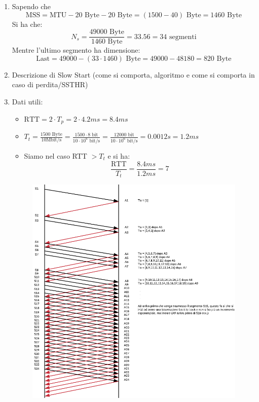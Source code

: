 \documentclass[10pt,a4paper]{article}
\begin{document}
	\begin{enumerate}
		\item Sapendo che $$\textrm{MSS} = \textrm{MTU} - 20 \textrm{ Byte} - 20 \textrm{ Byte} = (1500 - 40) \textrm{ Byte} = 1460 \textrm{ Byte}$$
			Si ha che: $$N_s = \frac{49000 \textrm{ Byte}}{1460 \textrm{ Byte}} = 33.56 = 34 \textrm{ segmenti}$$
			Mentre l'ultimo segmento ha dimensione: $$\textrm{Last} = 49000 - (33 \cdot 1460) \textrm{ Byte} = 49000 - 48180 = 820 \textrm{ Byte}$$
		\item Descrizione di Slow Start (come si comporta, algoritmo e come si comporta in caso di perdita/SSTHR)
		\item Dati utili:
			\begin{itemize}
				\item $\textrm{RTT} = 2 \cdot T_p = 2 \cdot 4.2 ms = 8.4 ms$
				\item $T_t = \displaystyle{\frac{1500 \textrm{ Byte}}{10 \textrm{Mbit/s}} = \frac{1500 \cdot 8 \textrm{ bit}}{10 \cdot 10^6 \textrm{ bit/s}} = \frac{12000 \textrm{ bit}}{10 \cdot 10^6 \textrm{ bit/s}} = 0.0012 s = 1.2 ms}$
				\item Siamo nel caso RTT $> T_t$ e si ha: $$\frac{\textrm{RTT}}{T_t} = \frac{8.4 ms}{1.2 ms} = 7$$
			\end{itemize}
			\begin{figure}[H]
				\centering
				\includegraphics[width=15cm]{Esame_SenzaPerdite_2212020}
			\end{figure}
	\end{enumerate}
\end{document}
